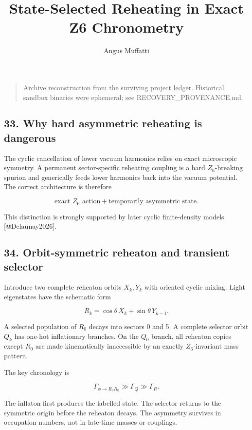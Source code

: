 \documentclass[
]{article}
\title{State-Selected Reheating in Exact Z6 Chronometry}
\author{Angus Muffatti}
\date{}
\begin{document}
\maketitle

\begin{quote}
Archive reconstruction from the surviving project ledger. Historical
sandbox binaries were ephemeral; see RECOVERY\_PROVENANCE.md.
\end{quote}

\hypertarget{why-hard-asymmetric-reheating-is-dangerous}{%
\subsection{33. Why hard asymmetric reheating is
dangerous}\label{why-hard-asymmetric-reheating-is-dangerous}}

The cyclic cancellation of lower vacuum harmonics relies on exact
microscopic symmetry. A permanent sector-specific reheating coupling is
a hard \(Z_6\)-breaking spurion and generically feeds lower harmonics
back into the vacuum potential. The correct architecture is therefore

\[
\boxed{
\text{exact }Z_6\text{ action}
+\text{temporarily asymmetric state}.
}
\]

This distinction is strongly supported by later cyclic finite-density
models {[}@Delaunay2026{]}.

\hypertarget{orbit-symmetric-reheaton-and-transient-selector}{%
\subsection{34. Orbit-symmetric reheaton and transient
selector}\label{orbit-symmetric-reheaton-and-transient-selector}}

Introduce two complete reheaton orbits \(X_k,Y_k\) with oriented cyclic
mixing. Light eigenstates have the schematic form

\[
R_k=\cos\theta\,X_k+\sin\theta\,Y_{k-1}.
\]

A selected population of \(R_0\) decays into sectors 0 and 5. A complete
selector orbit \(Q_k\) has one-hot inflationary branches. On the \(Q_0\)
branch, all reheaton copies except \(R_0\) are made kinematically
inaccessible by an exactly \(Z_6\)-invariant mass pattern.

The key chronology is

\[
\Gamma_{\phi\rightarrow R_0R_0}
\gg\Gamma_Q\gg\Gamma_R.
\]

The inflaton first produces the labelled state. The selector returns to
the symmetric origin before the reheaton decays. The asymmetry survives
in occupation numbers, not in late-time masses or couplings.
\end{document}
